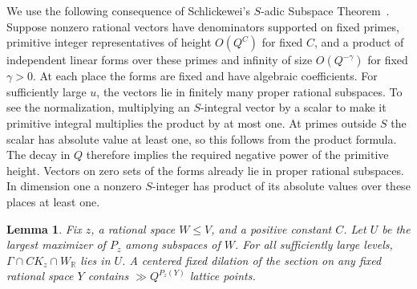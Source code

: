 \documentclass[11pt,reqno,a4paper]{amsart}
\newtheorem{lemma}[theorem]{Lemma}
\theoremstyle{remark}
\numberwithin{equation}{section}
\begin{document}
We use the following consequence of Schlickewei's $S$-adic Subspace
Theorem~\cite{Schlickewei}. Suppose nonzero rational vectors have
denominators supported on fixed primes, primitive integer
representatives of height $O(Q^C)$ for fixed $C$, and a product of
independent linear forms over these primes and infinity of size
$O(Q^{-\gamma})$ for fixed $\gamma>0$. At each place the forms are
fixed and have algebraic coefficients. For sufficiently large $u$,
the vectors lie in finitely many proper rational subspaces. To see
the normalization, multiplying an $S$-integral vector by a scalar to
make it primitive integral multiplies the product by at most one.
At primes outside $S$ the scalar has absolute value at least one,
so this follows from the product formula. The decay in $Q$ therefore
implies the required negative power of the primitive height.
Vectors on zero sets of the forms already lie in proper rational
subspaces. In dimension one a nonzero $S$-integer has product of
its absolute values over these places at least one.

\begin{lemma}\label{lem:primal-count}
Fix $z$, a rational space $W\le V$, and a positive constant $C$.
Let $U$ be the largest maximizer of $P_z$ among subspaces of $W$.
For all sufficiently large levels, $\Gamma\cap CK_z\cap W_{\mathbb R}$
lies in $U$. A centered fixed dilation of the section on any
fixed rational space $Y$ contains $\gg Q^{P_z(Y)}$ lattice points.
\end{lemma}
\end{document}
